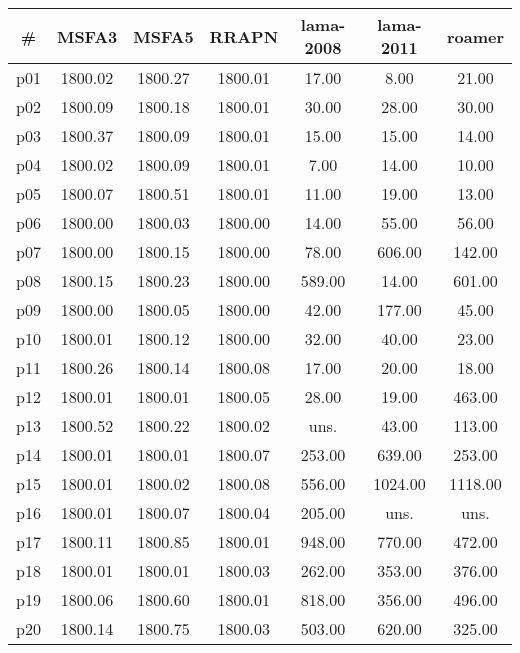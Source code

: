 \begin{tabular}{ccccccc}
\toprule
\textbf{\#} & \textbf{MSFA3} & \textbf{MSFA5} & \textbf{RRAPN} & \textbf{lama-2008} & \textbf{lama-2011} & \textbf{roamer}\\
\midrule
p01 & 1800.02 & 1800.27 & 1800.01 & 17.00 & 8.00 & 21.00\\
p02 & 1800.09 & 1800.18 & 1800.01 & 30.00 & 28.00 & 30.00\\
p03 & 1800.37 & 1800.09 & 1800.01 & 15.00 & 15.00 & 14.00\\
p04 & 1800.02 & 1800.09 & 1800.01 & 7.00 & 14.00 & 10.00\\
p05 & 1800.07 & 1800.51 & 1800.01 & 11.00 & 19.00 & 13.00\\
p06 & 1800.00 & 1800.03 & 1800.00 & 14.00 & 55.00 & 56.00\\
p07 & 1800.00 & 1800.15 & 1800.00 & 78.00 & 606.00 & 142.00\\
p08 & 1800.15 & 1800.23 & 1800.00 & 589.00 & 14.00 & 601.00\\
p09 & 1800.00 & 1800.05 & 1800.00 & 42.00 & 177.00 & 45.00\\
p10 & 1800.01 & 1800.12 & 1800.00 & 32.00 & 40.00 & 23.00\\
p11 & 1800.26 & 1800.14 & 1800.08 & 17.00 & 20.00 & 18.00\\
p12 & 1800.01 & 1800.01 & 1800.05 & 28.00 & 19.00 & 463.00\\
p13 & 1800.52 & 1800.22 & 1800.02 & uns. & 43.00 & 113.00\\
p14 & 1800.01 & 1800.01 & 1800.07 & 253.00 & 639.00 & 253.00\\
p15 & 1800.01 & 1800.02 & 1800.08 & 556.00 & 1024.00 & 1118.00\\
p16 & 1800.01 & 1800.07 & 1800.04 & 205.00 & uns. & uns.\\
p17 & 1800.11 & 1800.85 & 1800.01 & 948.00 & 770.00 & 472.00\\
p18 & 1800.01 & 1800.01 & 1800.03 & 262.00 & 353.00 & 376.00\\
p19 & 1800.06 & 1800.60 & 1800.01 & 818.00 & 356.00 & 496.00\\
p20 & 1800.14 & 1800.75 & 1800.03 & 503.00 & 620.00 & 325.00\\
\bottomrule
\end{tabular}

